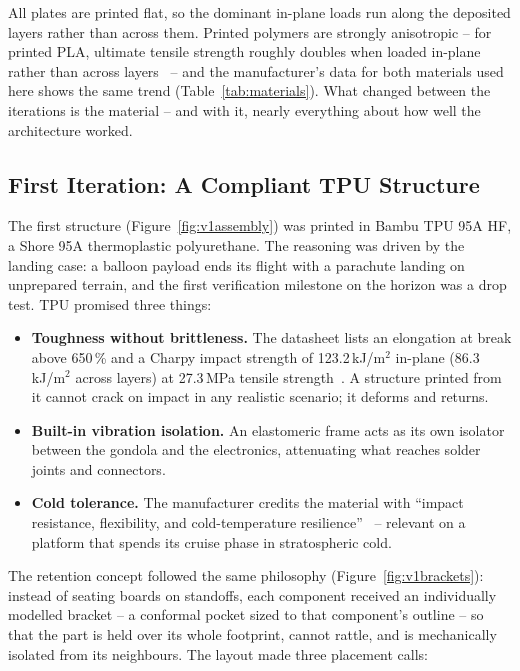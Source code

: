 All plates are printed flat, so the dominant in-plane loads run along the
deposited layers rather than across them. Printed polymers are strongly
anisotropic -- for printed PLA, ultimate tensile strength roughly doubles
when loaded in-plane rather than across layers~\cite{yao} -- and the
manufacturer's data for both materials used here shows the same trend
(Table~\ref{tab:materials}). What changed between the iterations is the
material -- and with it, nearly everything about how well the architecture
worked.

\subsection{First Iteration: A Compliant TPU Structure}

The first structure (Figure~\ref{fig:v1assembly}) was printed in Bambu TPU
95A HF, a Shore 95A thermoplastic polyurethane. The reasoning was driven by
the landing case: a balloon payload ends its flight with a parachute landing
on unprepared terrain, and the first verification milestone on the horizon
was a drop test. TPU promised three things:

\begin{itemize}
  \item \textbf{Toughness without brittleness.} The datasheet lists an
        elongation at break above 650\,\% and a Charpy impact strength of
        123.2\,kJ/m$^2$ in-plane (86.3\,kJ/m$^2$ across layers) at
        27.3\,MPa tensile strength~\cite{tpu}. A structure printed from it
        cannot crack on impact in any realistic scenario; it deforms and
        returns.
  \item \textbf{Built-in vibration isolation.} An elastomeric frame acts as
        its own isolator between the gondola and the electronics,
        attenuating what reaches solder joints and connectors.
  \item \textbf{Cold tolerance.} The manufacturer credits the material with
        ``impact resistance, flexibility, and cold-temperature
        resilience''~\cite{tpu} -- relevant on a platform that spends its
        cruise phase in stratospheric cold.
\end{itemize}

The retention concept followed the same philosophy
(Figure~\ref{fig:v1brackets}): instead of seating boards on standoffs, each
component received an individually modelled bracket -- a conformal pocket
sized to that component's outline -- so that the part is held over its whole
footprint, cannot rattle, and is mechanically isolated from its neighbours.
The layout made three placement calls:

